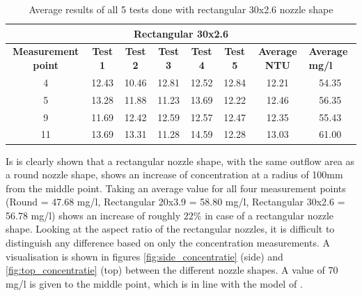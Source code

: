 \begin{table}[ht!]
\centering
\begin{tabular}{|c|c|c|c|c|c|c|c|}
\hline
\multicolumn{8}{|c|}{\textbf{Rectangular 30x2.6}} \\ \hline
\textbf{Measurement point} & \textbf{Test 1} & \textbf{Test 2} & \textbf{Test 3} & \textbf{Test 4} & \textbf{Test 5} & \textbf{Average NTU} & \multicolumn{1}{l|}{\textbf{Average mg/l}} \\ \hline
4 & 12.43 & 10.46 & 12.81 & 12.52 & 12.84 & 12.21 & 54.35 \\ \hline
5 & 13.28 & 11.88 & 11.23 & 13.69 & 12.22 & 12.46 & 56.35 \\ \hline
9 & 11.69 & 12.42 & 12.59 & 12.57 & 12.47 & 12.35 & 55.43 \\ \hline
11 & 13.69 & 13.31 & 11.28 & 14.59 & 12.28 & 13.03 & 61.00 \\ \hline
\end{tabular}
\caption{Average results of all 5 tests done with rectangular 30x2.6 nozzle shape}
\label{tab:rec30_concentration}
\end{table}
\newpage
\noindent Is is clearly shown that a rectangular nozzle shape, with the same outflow area as a round nozzle shape, shows an increase of concentration at a radius of 100mm from the middle point. Taking an average value for all four measurement points (Round = 47.68 mg/l, Rectangular 20x3.9 = 58.80 mg/l, Rectangular 30x2.6 = 56.78 mg/l) shows an increase of roughly $22\%$ in case of a rectangular nozzle shape. Looking at the aspect ratio of the rectangular nozzles, it is difficult to distinguish any difference based on only the concentration measurements. A visualisation is shown in figures \ref{fig:side_concentratie} (side) and \ref{fig:top_concentratie} (top) between the different nozzle shapes. A value of 70 mg/l is given to the middle point, which is in line with the model of \cite{Lee+}. 

